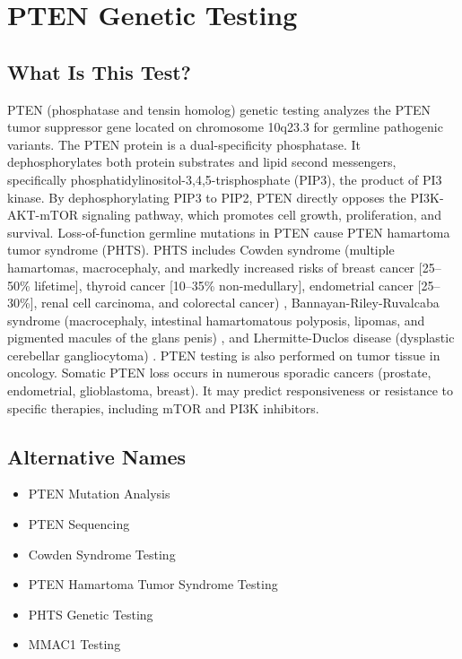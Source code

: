 \chapter{PTEN Genetic Testing}

\section*{What Is This Test?}
PTEN (phosphatase and tensin homolog) genetic testing analyzes the PTEN tumor suppressor gene located on chromosome 10q23.3 for germline pathogenic variants. The PTEN protein is a dual-specificity phosphatase. It dephosphorylates both protein substrates and lipid second messengers, specifically phosphatidylinositol-3,4,5-trisphosphate (PIP3), the product of PI3 kinase. By dephosphorylating PIP3 to PIP2, PTEN directly opposes the PI3K-AKT-mTOR signaling pathway, which promotes cell growth, proliferation, and survival. Loss-of-function germline mutations in PTEN cause PTEN hamartoma tumor syndrome (PHTS). PHTS includes Cowden syndrome (multiple hamartomas, macrocephaly, and markedly increased risks of breast cancer [25--50\% lifetime], thyroid cancer [10--35\% non-medullary], endometrial cancer [25--30\%], renal cell carcinoma, and colorectal cancer) \cite{tan2012lifetime}, Bannayan-Riley-Ruvalcaba syndrome (macrocephaly, intestinal hamartomatous polyposis, lipomas, and pigmented macules of the glans penis) \cite{marsh1997germline}, and Lhermitte-Duclos disease (dysplastic cerebellar gangliocytoma) \cite{pilarski2013cowden}. PTEN testing is also performed on tumor tissue in oncology. Somatic PTEN loss occurs in numerous sporadic cancers (prostate, endometrial, glioblastoma, breast). It may predict responsiveness or resistance to specific therapies, including mTOR and PI3K inhibitors.

\section*{Alternative Names}
\begin{itemize}
  \item PTEN Mutation Analysis
  \item PTEN Sequencing
  \item Cowden Syndrome Testing
  \item PTEN Hamartoma Tumor Syndrome Testing
  \item PHTS Genetic Testing
  \item MMAC1 Testing
\end{itemize}

